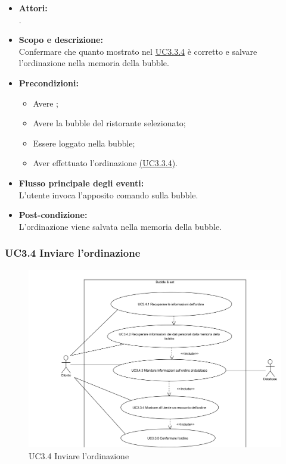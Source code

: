 \begin{itemize}
	\item \textbf{Attori:}
	\\.
	\item \textbf{Scopo e descrizione:} 
	\\Confermare che quanto mostrato nel  \hyperref[UC3.3.4]{UC3.3.4} è corretto e salvare l'ordinazione nella memoria della bubble.
	\item \textbf{Precondizioni:}
	\begin{itemize}
		\item Avere ;
		\item Avere la bubble del ristorante selezionato;
		\item Essere loggato nella bubble;
		\item Aver effettuato l’ordinazione \hyperref[UC3.3.4]{(UC3.3.4)}.
	\end{itemize}
	\item \textbf{Flusso principale degli eventi:}
	\\L'utente invoca l'apposito comando sulla bubble.
	\item \textbf{Post-condizione:}
	\\L’ordinazione viene salvata nella memoria della bubble.
\end{itemize}

\subsubsection{UC3.4 Inviare l’ordinazione} \label{UC3.4}

\begin{figure}[H]
	\centering
	\includegraphics[width=15cm]{../../documenti/AnalisiDeiRequisiti/Diagrammi_img/uc3_4.png}
	\caption{UC3.4 Inviare l’ordinazione}
\end{figure}

